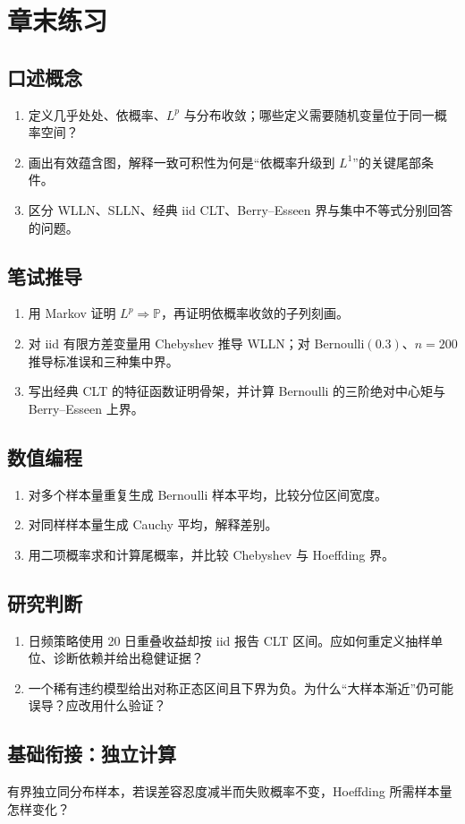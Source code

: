 \section*{章末练习}
\begingroup\small
\subsection*{口述概念}
\begin{enumerate}[nosep,leftmargin=*]
  \item 定义几乎处处、依概率、$L^p$ 与分布收敛；哪些定义需要随机变量位于同一概率空间？
  \item 画出有效蕴含图，解释一致可积性为何是“依概率升级到 $L^1$”的关键尾部条件。
  \item 区分 WLLN、SLLN、经典 iid CLT、Berry--Esseen 界与集中不等式分别回答的问题。
\end{enumerate}

\subsection*{笔试推导}
\begin{enumerate}[nosep,leftmargin=*]
  \item 用 Markov 证明 $L^p\Rightarrow\mathbb P$，再证明依概率收敛的子列刻画。
  \item 对 iid 有限方差变量用 Chebyshev 推导 WLLN；对 Bernoulli$(0.3)$、$n=200$ 推导标准误和三种集中界。
  \item 写出经典 CLT 的特征函数证明骨架，并计算 Bernoulli 的三阶绝对中心矩与 Berry--Esseen 上界。
\end{enumerate}

\subsection*{数值编程}
\begin{enumerate}[leftmargin=*]
  \item 对多个样本量重复生成 Bernoulli 样本平均，比较分位区间宽度。
  \item 对同样样本量生成 Cauchy 平均，解释差别。
  \item 用二项概率求和计算尾概率，并比较 Chebyshev 与 Hoeffding 界。
\end{enumerate}

\subsection*{研究判断}
\begin{enumerate}[nosep,leftmargin=*]
  \item 日频策略使用 20 日重叠收益却按 iid 报告 CLT 区间。应如何重定义抽样单位、诊断依赖并给出稳健证据？
  \item 一个稀有违约模型给出对称正态区间且下界为负。为什么“大样本渐近”仍可能误导？应改用什么验证？
\end{enumerate}
\endgroup


\MFQMappedUpperChNineQuestions

\subsection*{基础衔接：独立计算}
有界独立同分布样本，若误差容忍度减半而失败概率不变，Hoeffding 所需样本量怎样变化？
